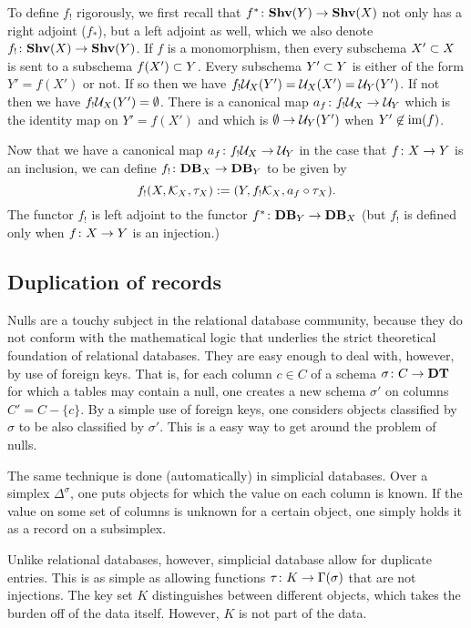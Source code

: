 \documentclass{amsart}
\def\DT{{\bf DT}}
\def\Data{{\bf DB}}
\def\im{\tn{im}}
\begin{document}
To define $f_!$ rigorously, we first recall that $f^*\taking\Shv(Y)\to\Shv(X)$ not only has a right adjoint ($f_*$), but a left adjoint as well, which we also denote $f_!\taking\Shv(X)\to\Shv(Y)$.  If $f$ is a monomorphism, then every subschema $X'\ss X$ is sent to a subschema $f(X')\ss Y$.  Every subschema $Y'\ss Y$ is either of the form $Y'=f(X')$ or not.  If so then we have $f_!\mcU_X(Y')=\mcU_X(X')=\mcU_Y(Y')$.  If not then we have $f_!\mcU_X(Y')=\emptyset$.  There is a canonical map $a_f\taking f_!\mcU_X\to\mcU_Y$ which is the identity map on $Y'=f(X')$ and which is $\emptyset\to\mcU_Y(Y')$ when $Y'\not\in\im(f)$.

Now that we have a canonical map $a_f\taking f_!\mcU_X\to\mcU_Y$ in the case that $f\taking X\to Y$ is an inclusion, we can define $f_!\taking\Data_X\to\Data_Y$ to be given by $$f_!(X,\mcK_X,\tau_X):=(Y,f_!\mcK_X,a_f\circ\tau_X).$$  The functor $f_!$ is left adjoint to the functor $f^*\taking\Data_Y\to\Data_X$ (but $f_!$ is defined only when $f\taking X\to Y$ is an injection.)

\subsection{Duplication of records}\label{subsec:duplication}

Nulls are a touchy subject in the relational database community, because they do not conform with the mathematical logic that underlies the strict theoretical foundation of relational databases.  They are easy enough to deal with, however, by use of foreign keys.  That is, for each column $c\in C$ of a schema $\sigma\taking C\to\DT$ for which a tables may contain a null, one creates a new schema $\sigma'$ on columns $C'=C-\{c\}$.  By a simple use of foreign keys, one considers objects classified by $\sigma$ to be also classified by $\sigma'$.  This is a easy way to get around the problem of nulls.

The same technique is done (automatically) in simplicial databases.  Over a simplex $\Delta^\sigma$, one puts objects for which the value on each column is known.  If the value on some set of columns is unknown for a certain object, one simply holds it as a record on a subsimplex.  

Unlike relational databases, however, simplicial database allow for duplicate entries.  This is as simple as allowing functions $\tau\taking K\to\Gamma(\sigma)$ that are not injections.  The key set $K$ distinguishes between different objects, which takes the burden off of the data itself.  However, $K$ is not part of the data.  
\end{document}
